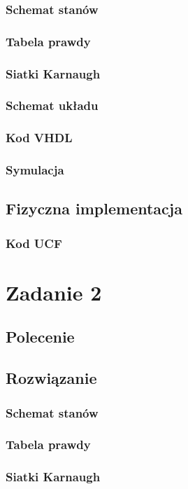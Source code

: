 \documentclass[a4paper,12pt]{extarticle}  %
\begin{document}
\subsubsection{Schemat stanów}
\subsubsection{Tabela prawdy}
\subsubsection{Siatki Karnaugh}
\subsubsection{Schemat układu}
\subsubsection{Kod VHDL}
\subsubsection{Symulacja}
\subsection{Fizyczna implementacja}
\subsubsection{Kod UCF}

\section{Zadanie 2}
\subsection{Polecenie}
\subsection{Rozwiązanie}
\subsubsection{Schemat stanów}
\subsubsection{Tabela prawdy}
\subsubsection{Siatki Karnaugh}
\end{document}
